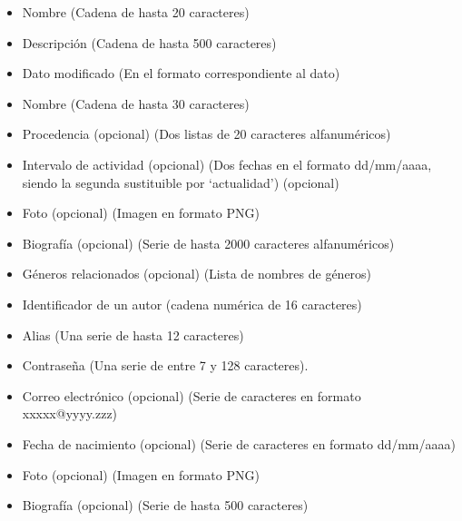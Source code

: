 \begin{itemize}
  \item Nombre (Cadena de hasta 20 caracteres)
  \item Descripción (Cadena de hasta 500 caracteres)
\end{itemize}

\begin{itemize}
\item Dato modificado (En el formato correspondiente al dato)
\end{itemize}

\begin{itemize}
  \item Nombre (Cadena de hasta 30 caracteres)
  \item Procedencia (opcional) (Dos listas de 20 caracteres alfanuméricos)
  \item Intervalo de actividad (opcional) (Dos fechas en el formato dd/mm/aaaa, siendo la segunda sustituible por `actualidad') (opcional)
  \item Foto (opcional) (Imagen en formato PNG)
  \item Biografía (opcional) (Serie de hasta 2000 caracteres alfanuméricos)
  \item Géneros relacionados (opcional) (Lista de nombres de géneros)
  \item Identificador de un autor (cadena numérica de 16 caracteres)
\end{itemize}



\begin{itemize}
  \item Alias (Una serie de hasta 12 caracteres)
  \item Contraseña (Una serie de entre 7 y 128 caracteres).
  \item Correo electrónico (opcional) (Serie de caracteres en formato xxxxx@yyyy.zzz)
  \item Fecha de nacimiento (opcional) (Serie de caracteres en formato dd/mm/aaaa)
  \item Foto (opcional) (Imagen en formato PNG)
  \item Biografía (opcional) (Serie de hasta 500 caracteres)
\end{itemize}

